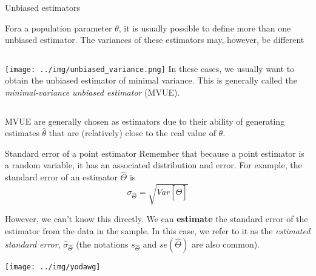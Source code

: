 \begin{frame}{Unbiased estimators}

Fora a population parameter $\theta$, it is usually possible to define more than one unbiased estimator. The variances of these estimators may, however, be different\bigskip

\begin{columns}[T]
    \vspace{-1.5em} \texttt{[image: ../img/unbiased\_variance.png]}
     In these cases, we usually want to obtain the unbiased estimator of minimal variance. This is generally called the \textit{minimal-variance unbiased estimator} (MVUE).
\end{columns}\bigskip

MVUE are generally chosen as estimators due to their ability of generating estimates $\hat{\theta}$ that are (relatively) close to the real value of $\theta$.
\end{frame}


\begin{frame}{Standard error of a point estimator}
Remember that because a point estimator is a random variable, it has an associated distribution and error. For example, the standard error of an estimator $\hat{\Theta}$ is
\begin{equation*}
\sigma_{\hat{\Theta}} = \sqrt{Var\left[\hat{\Theta}\right]}
\end{equation*}\bigskip

However, we can't know this directly. We can {\bf estimate} the standard error of the estimator from the data in the sample. In this case, we refer to it as the \textit{estimated standard error}, $\hat{\sigma}_{\hat{\Theta}}$ (the notations $s_{\hat{\Theta}}$ and $se(\hat{\Theta})$ are also common).

\hfill\texttt{[image: ../img/yodawg]}
\end{frame}

